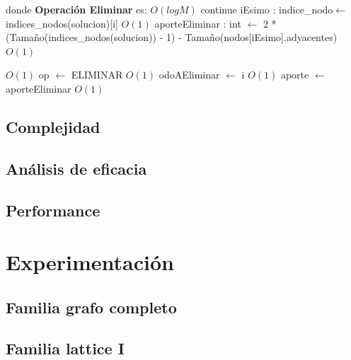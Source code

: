 \documentclass[a4paper, 10pt, twoside]{article}
\newenvironment{pseudo}[1][]{%
    \vspace{1em}%
    \begin{algorithmic}%
}
{%
    \end{algorithmic}%
    \vspace{1em}%
}
\newcommand{\Ode}[1]{\hfill $O(#1)$}
\begin{document}
\begin{pseudo}
\State
\State donde \textbf{Operación Eliminar} es:
\State
																					\Ode{log M}
				  \State continue
			\EndIf
			\State iEsimo : indice\_nodo$\leftarrow$ indices\_nodos(solucion)[i]									\Ode{1}
			\State aporteEliminar : int $\leftarrow$ 2 * (Tamaño(indices\_nodos(solucion)) - 1) -
			\State Tamaño(nodos[iEsimo].adyacentes)																	\Ode{1}

																						\Ode{1}
				\State op $\leftarrow$ ELIMINAR 																	\Ode{1}
				\State odoAEliminar $\leftarrow$ i 																	\Ode{1}
				\State aporte $\leftarrow$ aporteEliminar 															\Ode{1}
			\EndIf
		\EndFor

\State

\end{pseudo}

\subsection{Complejidad}
\subsection{Análisis de eficacia}
\subsection{Performance}




\newpage


\section{Experimentación}


\subsection{Familia grafo completo}

\begin{figure}[H]
	
\end{figure}

\begin{figure}[H]
	
\end{figure}


\subsection{Familia lattice I}

\begin{figure}[H]
	
\end{figure}

\begin{figure}[H]
	
\end{figure}
\end{document}
